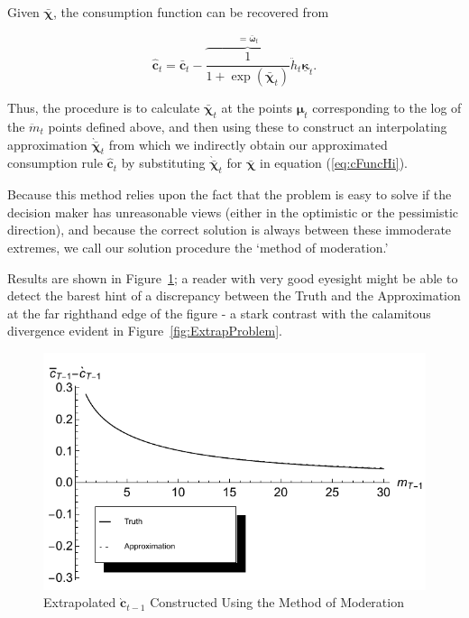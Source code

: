 \documentclass[twocolumn, switch]{article}
\newcommand{\mNrm}{m}
\newcommand{\cFunc}{\mathbf{c}}
\newcommand{\cFuncOpt}{\bar{\cFunc}}
\newcommand{\cFuncApprox}{\grave{\cFunc}}
\newcommand{\hNrm}{h}
\newcommand{\MPC}{\boldsymbol{\kappa}}
\newcommand{\MPCmin}{\underline{\MPC}}
\newcommand{\mNrmEx}{\ddot{\mNrm}}
\newcommand{\hNrmEx}{\ddot{\hNrm}}
\newcommand{\cFuncReal}{\hat{\cFunc}}
\newcommand{\modRte}{\boldsymbol{\bar{\omega}}}
\newcommand{\logmNrmEx}{\boldsymbol{\mu}}
\newcommand{\logitModRte}{\boldsymbol{\chi}}
\newcommand{\logitModRteFunc}{\bar{\logitModRte}}
\newcommand{\logitModRteFuncApprox}{\grave{\logitModRteFunc}}
\begin{document}
Given $\logitModRteFunc$, the consumption function can be recovered from

\begin{equation}
\label{eq:cFuncHi}
\cFuncReal_{t} = \cFuncOpt_{t}-\overbrace{\frac{1}{1+\exp(\logitModRteFunc_{t})}}^{=\modRte_t} \hNrmEx_{t} \MPCmin_{t}.
\end{equation}

Thus, the procedure is to calculate $\logitModRteFunc_{t}$ at the points
$\mathbf{\logmNrmEx}_{t}$ corresponding to the log of the $\mNrmEx_{t}$ points
defined above, and then using these to construct an interpolating approximation
$\logitModRteFuncApprox_{t}$ from which we indirectly obtain our approximated
consumption rule $\cFuncReal_{t}$ by substituting $\logitModRteFuncApprox_{t}$ for
$\logitModRteFunc$ in equation (\ref{eq:cFuncHi}).

Because this method relies upon the fact that the problem is easy to solve if
the decision maker has unreasonable views (either in the optimistic or the
pessimistic direction), and because the correct solution is always between these
immoderate extremes, we call our solution procedure the `method of moderation.'

Results are shown in Figure~\ref{fig:ExtrapProblemSolved}; a reader with very good
eyesight might be able to detect the barest hint of a discrepancy between the
Truth and the Approximation at the far righthand edge of the figure - a stark
contrast with the calamitous divergence evident in Figure~\ref{fig:ExtrapProblem}.

\begin{figure}[!htbp]
\centering
\includegraphics[width=0.8\linewidth]{files/ExtrapProblemSolvedP-056ca09fcb07ee29f643c2a27cdfd6bf.pdf}
\caption[]{Extrapolated $\cFuncApprox_{t -1}$ Constructed Using the Method of Moderation}
\label{fig:ExtrapProblemSolved}
\end{figure}
\end{document}
